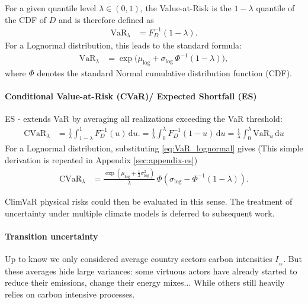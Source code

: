 For a given quantile level $ \lambda \in (0,1)$, the Value-at-Risk is the $1-\lambda$ quantile of the CDF of  $D$ and is therefore defined as
\begin{align}
\text{VaR}_\lambda &= F_D^{-1}(1-\lambda).
\end{align}
For a Lognormal distribution, this leads to the standard formula:
\begin{align}
\text{VaR}_\lambda &= \exp\!\big(\mu_{\text{log}} + \sigma_{\text{log}}\,\Phi^{-1}(1-\lambda)\big),
   \label{eq:VaR_lognormal}
\end{align}
where $ \Phi $ denotes the standard Normal cumulative distribution function (CDF).

\paragraph{Conditional Value-at-Risk (CVaR)/ Expected Shortfall (ES)}

ES \cite{Artzner}-\cite{Rockafellar} extends VaR by averaging all realizations exceeding the VaR threshold:
\begin{align}
\text{CVaR}_\lambda &= \frac{1}{\lambda}  \int_{1-\lambda}^{1} F_D^{-1}(u)\,\mathrm{d}u. 
%
= \frac{1}{\lambda} \int_{0}^{\lambda} F_D^{-1}(1-u)\,\mathrm{d}u
%
= \frac{1}{\lambda} \int_{0}^{\lambda} \text{VaR}_u \,\mathrm{d}u
\label{eq:CVaR_def}
\end{align}
For a Lognormal distribution, substituting \eqref{eq:VaR_lognormal} gives (This simple derivation is repeated in Appendix \ref{sec:appendix-es})
\begin{align}
\text{CVaR}_\lambda &= \frac{\exp\!\left(\mu_{\text{log}}+\frac{1}{2}\sigma_{\text{log}}^2\right)}{\lambda}
      \,\Phi\!\left(\sigma_{\text{log}} - \Phi^{-1}(1-\lambda)\right).
      \label{eq:CVaR_lognormal}
\end{align}

ClimVaR physical risks could then be evaluated in this sense. The treatment of uncertainty under multiple climate models is deferred to subsequent work.

\paragraph{Transition uncertainty}

Up to know we only considered average country sectors carbon intensities $I_{_{cs}}$. But these averages hide large variances: some virtuous actors have already started to reduce their emissions, change their energy mixes... While others still heavily relies on carbon intensive processes. 


